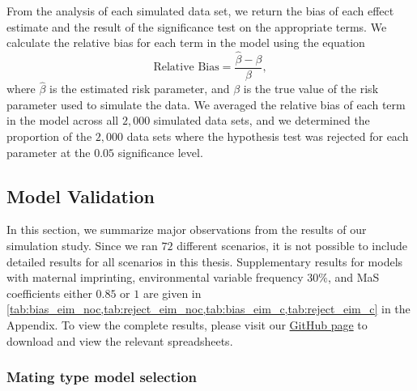From the analysis of each simulated data set, we return the bias of each effect estimate and the result of the significance test on the appropriate terms.
We calculate the relative bias for each term in the model using the equation
\begin{equation}
  \text{Relative Bias} = \frac{\hat\beta - \beta}{\beta},
\end{equation}
where $\hat\beta$ is the estimated risk parameter, and $\beta$ is the true value of the risk parameter used to simulate the data.
We averaged the relative bias of each term in the model across all $2,000$ simulated data sets, and we determined the proportion of the $2,000$ data sets where the hypothesis test was rejected for each parameter at the $0.05$ significance level.

\subsection{Model Validation}

In this section, we summarize major observations from the results of our simulation study.
Since we ran $72$ different scenarios, it is not possible to include detailed results for all scenarios in this thesis.
Supplementary results for models with maternal imprinting, environmental variable frequency $30\%$, and MaS coefficients either $0.85$ or $1$ are given in \cref{tab:bias_eim_noc,tab:reject_eim_noc,tab:bias_eim_c,tab:reject_eim_c} in the Appendix.
To view the complete results, please visit our \href{https://github.com/KevinHZhao/MSc_Thesis/tree/main/UOthesis/tables/fulltables}{GitHub page} to download and view the relevant spreadsheets.

\subsubsection{Mating type model selection}

